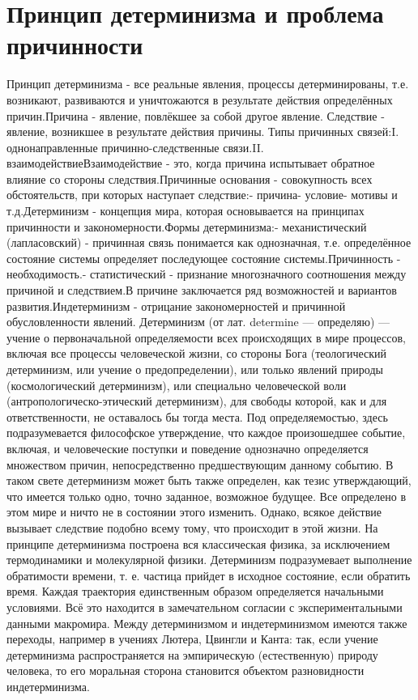 \documentclass[12pt]{article}
\begin{document}
\section{Принцип детерминизма и проблема причинности}
Принцип  детерминизма - все реальные явления, процессы детерминированы, т.е. возникают,  развиваются и
уничтожаются в результате действия определённых причин.Причина - явление,  повлёкшее за собой другое
явление.  Следствие  -  явление,  возникшее  в  результате   действия  причины.  Типы  причинных  связей:I.
однонаправленные  причинно-следственные   связи.II.  взаимодействиеВзаимодействие  -  это,  когда  причина
испытывает обратное влияние со стороны следствия.Причинные основания - совокупность всех обстоятельств,
при которых наступает следствие:- причина- условие- мотивы и т.д.Детерминизм - концепция мира, которая
основывается  на  принципах  причинности  и  закономерности.Формы  детерминизма:-   механистический
(лапласовский)  -  причинная  связь  понимается  как  однозначная,  т.е.   определённое  состояние  системы
определяет  последующее  состояние  системы.Причинность   -  необходимость.-  статистический  -  признание
многозначного  соотношения  между  причиной   и  следствием.В  причине  заключается  ряд  возможностей  и
вариантов развития.Индетерминизм - отрицание закономерностей и причинной обусловленности явлений.
Детерминизм (от лат. determine — определяю) — учение о первоначальной определяемости всех происходящих
в мире процессов, включая все процессы человеческой жизни, со стороны Бога (теологический детерминизм,
или учение о предопределении), или только явлений природы (космологический детерминизм), или специально
человеческой  воли  (антропологическо-этический  детерминизм),  для  свободы  которой,  как  и  для
ответственности, не оставалось бы тогда места. Под определяемостью, здесь подразумевается философское
утверждение, что каждое произошедшее событие, включая, и человеческие поступки и поведение однозначно 
определяется  множеством  причин,  непосредственно  предшествующим  данному  событию.  В  таком  свете
детерминизм может быть также определен, как тезис утверждающий, что имеется только одно, точно заданное,
возможное будущее.
Все  определено  в  этом  мире  и  ничто  не  в  состоянии  этого  изменить.  Однако,  всякое  действие  вызывает
следствие  подобно  всему  тому,  что  происходит  в  этой  жизни.  На  принципе  детерминизма  построена  вся
классическая физика, за исключением термодинамики и молекулярной физики. Детерминизм подразумевает
выполнение обратимости времени, т. е. частица прийдет в исходное состояние, если обратить время. Каждая
траектория единственным образом определяется начальными условиями. Всё это находится в замечательном
согласии с экспериментальными данными макромира.
Между детерминизмом и индетерминизмом имеются также переходы, например в учениях Лютера, Цвингли и
Канта: так, если учение детерминизма распространяется на эмпирическую (естественную) природу человека, то
его моральная сторона становится объектом разновидности индетерминизма.
\end{document}
